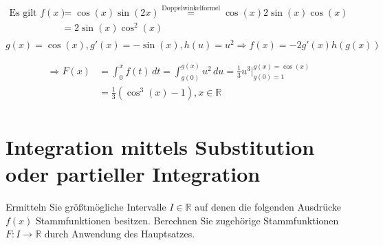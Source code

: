 \documentclass{article}
\begin{document}
\begin{enumerate}[a)]
  \begin{align*}
    \text{Es gilt } f(x) &= \cos (x) \sin (2x) \overset{\text{Doppelwinkelformel}}= \cos (x) 2 \sin (x) \cos (x) \\
                         &= 2 \sin (x) \cos^2 (x) \\
  \end{align*}
  $g(x) = \cos(x), g'(x) = - \sin(x), h(u) = u^2 \Rightarrow f(x) = -2 g'(x) h(g(x))$

  \begin{align*}
    \Rightarrow F(x) &= \int_0^x f(t) \,dt = \int_{g(0)}^{g(x)} u^2 \,du = \frac{1}{3} u^3 {\Big |}_{g(0) = 1}^{g(x) = \cos(x)} \\
                     &= \frac{1}{3} (\cos^3 (x) - 1 ), x \in \mathbb{R} \\
  \end{align*}

 \end{enumerate}

\section*{Integration mittels Substitution oder partieller Integration}

Ermitteln Sie größtmögliche Intervalle $I \in \mathbb{R}$ auf denen die
folgenden Ausdrücke $f(x)$ Stammfunktionen besitzen.
Berechnen Sie zugehörige Stammfunktionen $F \colon I \to \mathbb{R}$
durch Anwendung des Hauptsatzes.
\end{document}
